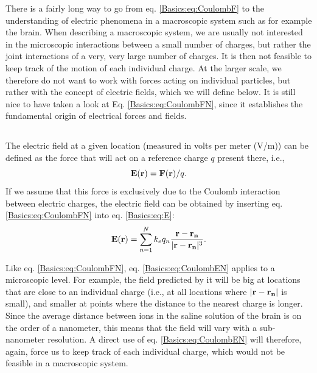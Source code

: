 There is a fairly long way to go from eq. \ref{Basics:eq:CoulombF} to the understanding of electric phenomena in a macroscopic system such as for example the brain. When describing a macroscopic system, we are usually not interested in the microscopic interactions between a small number of charges, but rather the joint interactions of a very, very large number of charges. It is then not feasible to keep track of the motion of each individual charge. At the larger scale, we therefore do not want to work with forces acting on individual particles, but rather with the concept of electric fields, which we will define below. It is still nice to have taken a look at  Eq. \ref{Basics:eq:CoulombFN}, since it establishes the fundamental origin of electrical forces and fields. 


\subsection{}
\label{sec:Basics:Fields} 
The electric field at a given location (measured in volts per meter (V/m)) can be defined as the force that will act on a reference charge $q$ present there, i.e., 
\begin{equation}
{\bf E}({\bf r}) = {\bf F}({\bf r})/q.
\label{Basics:eq:E}
\end{equation}
If we assume that this force is exclusively due to the Coulomb interaction between electric charges, the electric field can be obtained by inserting eq. \ref{Basics:eq:CoulombFN} into eq. \ref{Basics:eq:E}:
\begin{equation}
{\bf E}({\bf r}) = \sum_{n=1}^N k_e q_n \frac{{\bf r}-{\bf r_n}}{|{\bf r}-{\bf r_n}|^3}.
\label{Basics:eq:CoulombEN}
\end{equation}

Like eq. \ref{Basics:eq:CoulombFN}, eq. \ref{Basics:eq:CoulombEN} applies to a microscopic level. For example, the field predicted by it will be big at locations that are close to an individual charge (i.e., at all locations where $|{\bf r}-{\bf r_n}|$ is small), and smaller at points where the distance to the nearest charge is longer. Since the average distance between ions in the saline solution of the brain is on the order of a nanometer, this means that the field will vary with a sub-nanometer resolution. A direct use of eq. \ref{Basics:eq:CoulombEN} will therefore, again, force us to keep track of each individual charge, which would not be feasible in a macroscopic system.


